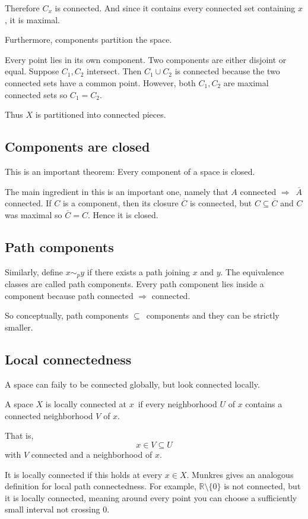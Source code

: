\documentclass[11pt]{article}
\begin{document}
Therefore $C_x$ is connected. 
And since it contains every connected set 
containing $x$, it is maximal. 

Furthermore, components partition the space. 

Every point lies in its own component. Two components 
are either disjoint or equal. 
Suppose $C_1, C_2$ intersect. Then 
$C_1 \cup C_2$ is connected because the 
two connected sets have a common point. 
However, both $C_1,C_2$ are maximal connected sets so 
$C_1 = C_2$. 

Thus $X$ is partitioned into connected pieces. 

\subsection{Components are closed}
This is an important theorem: 
Every component of a space is closed. 

The main ingredient in this is an important one, 
namely that $A$ connected $\Rightarrow$ $\overline A$ connected. 
If $C$ is a component, then its closure $\overline C$ is connected, 
but $C \subseteq \overline C$ and $C$ was maximal so 
$\overline C = C$. Hence it is closed.  

\subsection{Path components} 
Similarly, define $x \sim_{p} y$ if there 
exists a path joining $x$ and $y$. 
The equivalence classes are called path components. 
Every path component lies inside a component because 
path connected $\Rightarrow$ connected. 

So conceptually, path components $\subseteq$ components and 
they can be strictly smaller. 

\subsection{Local connectedness} 

A space can faily to be connected globally, but look 
connected locally. 

A space $X$ is locally connected at $x$ if every 
neighborhood $U$ of $x$ contains a connected neighborhood 
$V$ of $x$. 

That is, 
\[
    x \in V \subseteq U
\]
with $V$ connected and a neighborhood of $x$. 

It is locally connected if this holds at every $x \in X$. 
Munkres gives an analogous definition for local path connectedness. 
For example, $\mathbb R \setminus \{0\}$ is not connected, 
but it is locally connected, meaning around every point 
you can choose a sufficiently small interval not crossing $0$. 
\end{document}
